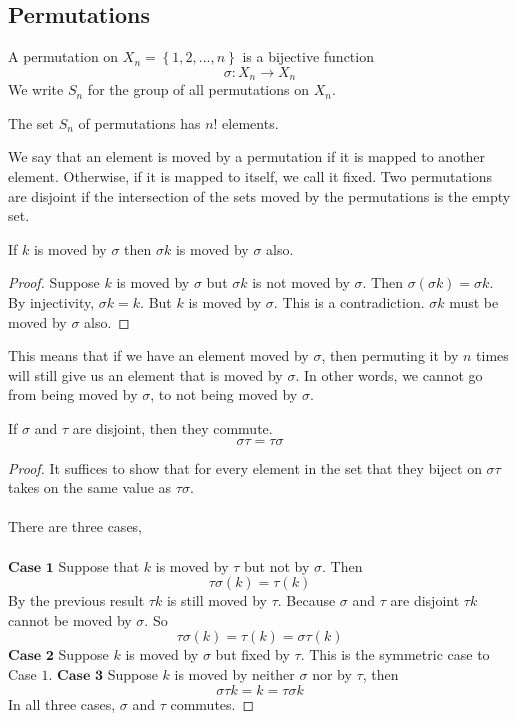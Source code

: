 \documentclass{article}
\begin{document}
\subsection{Permutations}
\begin{definition}
    A permutation on $X_n=\left\{ 1,2,...,n \right\}$ is a bijective function 
    \[
    \sigma: X_n \rightarrow X_n
    \]
    We write $S_n$ for the group of all permutations on $X_n$.
\end{definition}
\begin{theorem}
    The set $S_n$ of permutations has $n!$ elements.
\end{theorem}
We say that an element is moved by a permutation if it is mapped to another element. Otherwise, if it is mapped to itself, we call it fixed.
Two permutations are disjoint if the intersection of the sets moved by the permutations is the empty set.
\begin{theorem}
If $k$ is moved by $\sigma$ then $\sigma k$ is moved by $\sigma $ also.
\end{theorem}
\begin{proof}
    Suppose $k$ is moved by $\sigma$ but $\sigma k$ is not moved by $\sigma$. Then 
    $\sigma(\sigma k)=\sigma k$. By injectivity, $\sigma k=k$. But $k$ is moved by $\sigma$. This is a contradiction. $\sigma k$ must be moved by $\sigma$ also.
\end{proof}
This means that if we have an element moved by $\sigma$, then permuting it by $n$ times will still give us an element that is moved by $\sigma$. In other words, we cannot go from being moved 
by $\sigma$, to not being moved by $\sigma$.
\begin{theorem}
    If $\sigma$ and $\tau$ are disjoint, then they commute.
    \[
    \sigma \tau = \tau \sigma
    \]
\end{theorem}
\begin{proof}
    It suffices to show that for every element in the set that they biject on $\sigma \tau$ takes on the same 
    value as $\tau \sigma$.
    \\\\
    There are three cases,\\\\
    $\textbf{Case 1}$
    Suppose that $k$ is moved by $\tau$ but not by $\sigma$. Then 
    \[
    \tau\sigma(k)=\tau (k)
    \]
    By the previous result $\tau k$ is still moved by $\tau$. Because $\sigma$ and $\tau$ are disjoint
    $\tau k$ cannot be moved by $\sigma$. So
    \[
    \tau\sigma(k)=\tau (k)= \sigma\tau(k)
    \]
    $\textbf{Case 2}$ 
    Suppose $k$ is moved by $\sigma$ but fixed by $\tau$. This is the symmetric case to Case $1$.
    $\textbf{Case 3}$ 
    Suppose $k$ is moved by neither $\sigma$ nor by $\tau$, then
    \[
    \sigma \tau k = k =\tau \sigma k
    \]
    In all three cases, $\sigma$ and $\tau$ commutes.
\end{proof}
\end{document}

